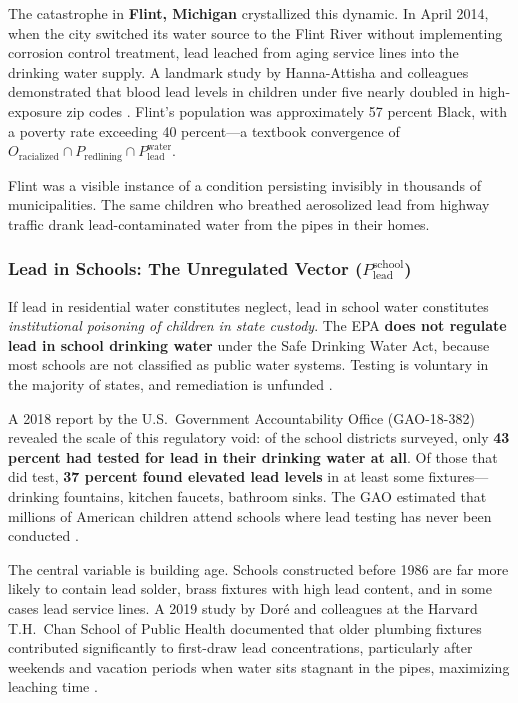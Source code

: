 The catastrophe in \textbf{Flint, Michigan} crystallized this dynamic. In April 2014, when the city switched its water source to the Flint River without implementing corrosion control treatment, lead leached from aging service lines into the drinking water supply. A landmark study by Hanna-Attisha and colleagues demonstrated that blood lead levels in children under five nearly doubled in high-exposure zip codes \cite{tel_flint}. Flint's population was approximately 57 percent Black, with a poverty rate exceeding 40 percent---a textbook convergence of $O_{\text{racialized}} \cap P_{\text{redlining}} \cap P_{\text{lead}}^{\text{water}}$.

Flint was a visible instance of a condition persisting invisibly in thousands of municipalities. The same children who breathed aerosolized lead from highway traffic drank lead-contaminated water from the pipes in their homes.

\subsubsection{Lead in Schools: The Unregulated Vector (\texorpdfstring{$P_{\text{lead}}^{\text{school}}$}{P\_lead\^school})}

If lead in residential water constitutes neglect, lead in school water constitutes \textit{institutional poisoning of children in state custody}. The EPA \textbf{does not regulate lead in school drinking water} under the Safe Drinking Water Act, because most schools are not classified as public water systems. Testing is voluntary in the majority of states, and remediation is unfunded \cite{tel_gao}.

A 2018 report by the U.S.\ Government Accountability Office (GAO-18-382) revealed the scale of this regulatory void: of the school districts surveyed, only \textbf{43 percent had tested for lead in their drinking water at all}. Of those that did test, \textbf{37 percent found elevated lead levels} in at least some fixtures---drinking fountains, kitchen faucets, bathroom sinks. The GAO estimated that millions of American children attend schools where lead testing has never been conducted \cite{tel_gao}.

The central variable is building age. Schools constructed before 1986 are far more likely to contain lead solder, brass fixtures with high lead content, and in some cases lead service lines. A 2019 study by Dor\'{e} and colleagues at the Harvard T.H.\ Chan School of Public Health documented that older plumbing fixtures contributed significantly to first-draw lead concentrations, particularly after weekends and vacation periods when water sits stagnant in the pipes, maximizing leaching time \cite{tel_dore}.


